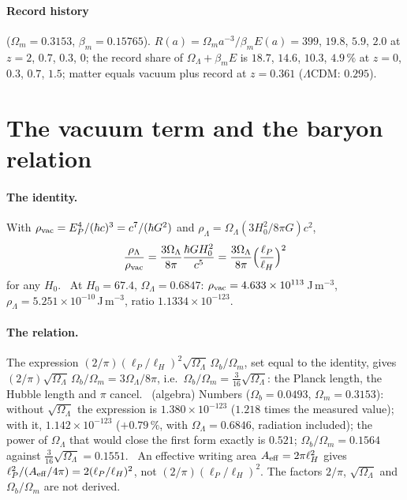 \paragraph{Record history} ($\Omega_m=0.3153$, $\beta_m=0.15765$). $R(a)=\Omega_ma^{-3}/\beta_mE(a)=399$, $19.8$, $5.9$, $2.0$ at $z=2$, $0.7$, $0.3$, $0$;
the record share of $\Omega_\Lambda+\beta_mE$ is $18.7$, $14.6$, $10.3$, $4.9\,\%$ at $z=0$, $0.3$, $0.7$, $1.5$; matter equals vacuum plus record at
$z=0.361$ ($\Lambda$CDM: $0.295$). \calc

\section{The vacuum term and the baryon relation}\label{app:der:lambda}
\paragraph{The identity.} With $\rho_{\rm vac}=E_P^4/(\hbar c)^3=c^7/(\hbar G^2)$ and $\rho_\Lambda=\Omega_\Lambda(3H_0^2/8\pi G)c^2$,
\begin{equation}
\frac{\rho_\Lambda}{\rho_{\rm vac}}=\frac{3\Omega_\Lambda}{8\pi}\frac{\hbar GH_0^2}{c^5}=\frac{3\Omega_\Lambda}{8\pi}\Big(\frac{\ell_P}{\ell_H}\Big)^2
\end{equation}
for any $H_0$. \derived\ At $H_0=67.4$, $\Omega_\Lambda=0.6847$: $\rho_{\rm vac}=4.633\times10^{113}$\,J\,m$^{-3}$, $\rho_\Lambda=5.251\times10^{-10}$\,J\,m$^{-3}$,
ratio $1.1334\times10^{-123}$. \calc

\paragraph{The relation.} The expression $(2/\pi)(\ell_P/\ell_H)^2\sqrt{\Omega_\Lambda}\,\Omega_b/\Omega_m$, set equal to the identity, gives
$(2/\pi)\sqrt{\Omega_\Lambda}\,\Omega_b/\Omega_m=3\Omega_\Lambda/8\pi$, i.e.\ $\Omega_b/\Omega_m=\tfrac3{16}\sqrt{\Omega_\Lambda}$: the Planck length, the Hubble
length and $\pi$ cancel. \derived\ (algebra) Numbers ($\Omega_b=0.0493$, $\Omega_m=0.3153$): without $\sqrt{\Omega_\Lambda}$ the expression is
$1.380\times10^{-123}$ ($1.218$ times the measured value); with it, $1.142\times10^{-123}$ ($+0.79\,\%$, with $\Omega_\Lambda=0.6846$, radiation included); the power of $\Omega_\Lambda$ that would close the first
form exactly is $0.521$; $\Omega_b/\Omega_m=0.1564$ against $\tfrac3{16}\sqrt{\Omega_\Lambda}=0.1551$. \calc\ An effective writing area $A_{\rm eff}=2\pi\ell_H^2$
gives $\ell_P^2/(A_{\rm eff}/4\pi)=2(\ell_P/\ell_H)^2$, not $(2/\pi)(\ell_P/\ell_H)^2$. The factors $2/\pi$, $\sqrt{\Omega_\Lambda}$ and $\Omega_b/\Omega_m$ are
not derived. \openprob

